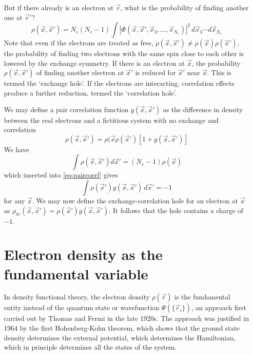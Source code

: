 \documentclass[11pt]{scrbook}   %
\begin{document}
But if there already is an electron at $\vec{r}$, what is the probability of finding another one at $\vec{r}'$? 
\begin{equation}
  \rho(\vec{x},\vec{x}') = N_e(N_e-1)\int |\Phi(\vec{x},\vec{x}',\vec{x}_3,\ldots,\vec{x}_{N_e} )|^2
 \,d\vec{x}_3\cdots d\vec{x}_{N_e}
\end{equation}
Note that even if the electrons are treated as free, $\rho(\vec{x},\vec{x}')\neq\rho(\vec{x})\rho(\vec{x}')$, the probability of finding two electrons with the same spin close to each other is lowered by the exchange symmetry. If there is an electron at $\vec{x}$, the probability $\rho(\vec{x},\vec{x}')$ of finding another electron at $\vec{x}'$ is reduced for $\vec{x}'$ near $\vec{x}$. 
This is termed the `exchange hole'.
If the electrons are interacting, correlation effects produce a further reduction, termed the `correlation hole'.

We may define a pair correlation function $g(\vec{x},\vec{x}')$ as the difference in density between the real electrons and a fictitious system with no exchange and correlation
\begin{equation}
  \rho(\vec{x},\vec{x}') = \rho(\vec{x}\rho(\vec{x}')[1 + g(\vec{x},\vec{x}')]
  \label{eq:paircorrf}
\end{equation}
We have
\begin{equation}
  \int \rho(\vec{x},\vec{x}') d\vec{x}' = (N_e-1)\rho(\vec{x})
\end{equation}
which inserted into \eqref{eq:paircorrf} gives
\begin{equation}
  \int \rho(\vec{x}') g(\vec{x},\vec{x}')\, d\vec{x}' = -1
\end{equation}
for any $\vec{x}$. We may now define the exchange-correlation hole for an electron at $\vec{x}$ as $\rho_{\text{xc}}(\vec{x},\vec{x}') = \rho(\vec{x}')g(\vec{x},\vec{x}')$. It follows that the hole contains a charge of $-1$.


\section{Electron density as the fundamental variable}

In density functional theory, the electron density $\rho(\vec{r})$ is the
fundamental entity instead of the quantum state or wavefunction
$\Psi(\{\vec{r}_i\})$, an
approach first carried out by Thomas\cite{Thomas:1927} and 
Fermi\cite{Fermi:1928} in the late 1920s. The approach was
justified in 1964 by the first Hohenberg-Kohn theorem\cite{HohenbergKohn:1964}, 
which shows that the ground state density determines the external potential,
which determines the Hamiltonian, which in principle determines all the 
states of the system.
\end{document}
